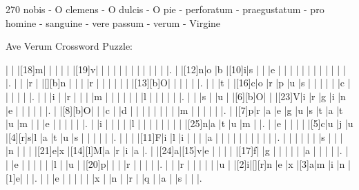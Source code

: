 \documentclass[12pt]{article}
\begin{document}
\pagestyle{fancy}
\fancyhf{}
\renewcommand{\headrulewidth}{0pt}
\renewcommand{\footrulewidth}{0pt}
\libertine
\renewcommand\PuzzleClueFont{\rm\normalsize}
\noindent\begin{rotate}{0}
\small
\end{rotate}
\hfill
\begin{rotate}{270}
\small
nobis - O clemens - O dulcis - O pie - perforatum - praegustatum - pro homine - sanguine - vere passum - verum - Virgine 
\end{rotate}
\begin{center}
  \huge{Ave Verum Crossword Puzzle:}
\end{center}
\vspace{1.5cm}
\begin{Puzzle}{22}{24}
  |{}  |{}  |[18]m|{}  |{}  |{}  |{}  |{}  |[19]v|{}  |{}  |{}  |{}  |{}  |{}  |{}  |{}  |{}  |{}  |{}  |{}  |.
  |{}  |[12]n|o   |b   |[10]i|s   |{}  |{}  |e   |{}  |{}  |{}  |{}  |{}  |{}  |{}  |{}  |{}  |{}  |{}  |{}  |.
  |{}  |{}  |r   |{}  |[][b]n   |{}  |{}  |{}  |r   |{}  |{}  |{}  |{}  |{}  |{}  |[13][b]O|{}  |{}  |{}  |{}  |{}  |.
  |{}  |{}  |t   |{}  |[16]c|o   |r   |p   |u   |s   |{}  |{}  |{}  |{}  |{}  |c   |{}  |{}  |{}  |{}  |{}  |.
  |{}  |{}  |i   |{}  |r   |{}  |{}  |{}  |m   |{}  |{}  |{}  |{}  |{}  |{}  |l   |{}  |{}  |{}  |{}  |{}  |.
  |{}  |{}  |s   |{}  |u   |{}  |[6][b]O|{}  |{}  |[23]V|i   |r   |g   |i   |n   |e   |{}  |{}  |{}  |{}  |{}  |.
  |{}  |[8][b]O|{}  |{}  |c   |{}  |d   |{}  |{}  |{}  |{}  |{}  |{}  |{}  |{}  |m   |{}  |{}  |{}  |{}  |{}  |.
  |{}  |[7]p|r   |a   |e   |g   |u   |s   |t   |a   |t   |u   |m   |{}  |{}  |e   |{}  |{}  |{}  |{}  |{}  |.
  |{}  |i   |{}  |{}  |{}  |{}  |l   |{}  |{}  |{}  |{}  |{}  |{}  |{}  |{}  |[25]n|a   |t   |u   |m   |{}  |.
  |{}  |e   |{}  |{}  |{}  |{}  |[5]c|u   |j   |u   |[4][r]s|l   |a   |t   |u   |s   |{}  |{}  |{}  |{}  |{}  |.
  |{}  |{}  |{}  |[11]F|i   |l   |i   |{}  |{}  |{}  |a   |{}  |{}  |{}  |{}  |{}  |{}  |{}  |{}  |{}  |{}  |.
  |{}  |{}  |{}  |{}  |{}  |{}  |s   |{}  |{}  |{}  |n   |{}  |{}  |{}  |[21]e|x   |[14][l]M|a   |r   |i   |a   |.
  |{}  |[24]a|[15]v|e   |{}  |{}  |{}  |{}  |[17]f|{}  |g   |{}  |{}  |{}  |{}  |{}  |a   |{}  |{}  |{}  |{}  |.
  |{}  |{}  |e   |{}  |{}  |{}  |{}  |{}  |l   |{}  |u   |{}  |[20]p|{}  |{}  |{}  |r   |{}  |{}  |{}  |{}  |.
  |{}  |{}  |r   |{}  |{}  |{}  |{}  |{}  |u   |{}  |[2]i|[][r]n   |e   |x   |[3]a|m   |i   |n   |[1]e|{}  |{}  |.
  |{}  |{}  |e   |{}  |{}  |{}  |{}  |{}  |x   |{}  |n   |{}  |r   |{}  |q   |{}  |a   |{}  |s   |{}  |{}  |.

\end{Puzzle}
\end{document}
